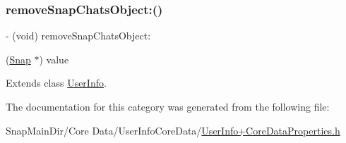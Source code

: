 \hypertarget{category_user_info_07_core_data_generated_accessors_08_a8ac63ce90e9911d188c01c95ec18b638}{}\label{category_user_info_07_core_data_generated_accessors_08_a8ac63ce90e9911d188c01c95ec18b638} 
\subsubsection{\texorpdfstring{remove\+Snap\+Chats\+Object\+:()}{removeSnapChatsObject:()}}
{\footnotesize\ttfamily -\/ (void) remove\+Snap\+Chats\+Object\+: \begin{DoxyParamCaption}\item[{(\hyperlink{interface_snap}{Snap} $\ast$)}]{value }\end{DoxyParamCaption}}



Extends class \hyperlink{interface_user_info_a8ac63ce90e9911d188c01c95ec18b638}{User\+Info}.



The documentation for this category was generated from the following file\+:\begin{DoxyCompactItemize}
\item 
Snap\+Main\+Dir/\+Core Data/\+User\+Info\+Core\+Data/\hyperlink{_user_info_09_core_data_properties_8h}{User\+Info+\+Core\+Data\+Properties.\+h}\end{DoxyCompactItemize}
